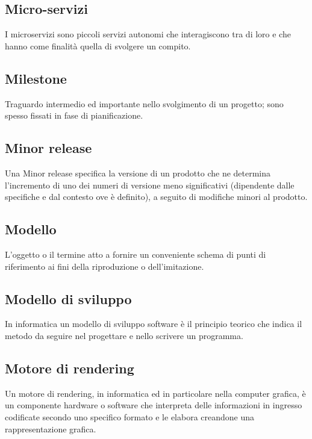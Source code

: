 \subsection*{Micro-servizi}
I microservizi sono piccoli servizi autonomi che interagiscono tra di loro e che hanno come finalità quella di svolgere un compito.

\subsection*{Milestone}
Traguardo intermedio ed importante nello svolgimento di un progetto; sono spesso fissati in fase di pianificazione.

\subsection*{Minor release}
Una Minor release specifica la versione di un prodotto che ne determina l’incremento di uno dei numeri di versione meno significativi (dipendente dalle specifiche e dal contesto ove è definito), a seguito di modifiche minori al prodotto.

\subsection*{Modello}
L'oggetto o il termine atto a fornire un conveniente schema di punti di riferimento ai fini della riproduzione o dell'imitazione.

\subsection*{Modello di sviluppo}
In informatica un modello di sviluppo software è il principio teorico che indica il metodo da seguire nel progettare e nello scrivere un programma.

\subsection*{Motore di rendering}
Un motore di rendering, in informatica ed in particolare nella computer grafica, è un componente hardware o software che interpreta delle informazioni in ingresso codificate secondo uno specifico formato e le elabora creandone una rappresentazione grafica. 

